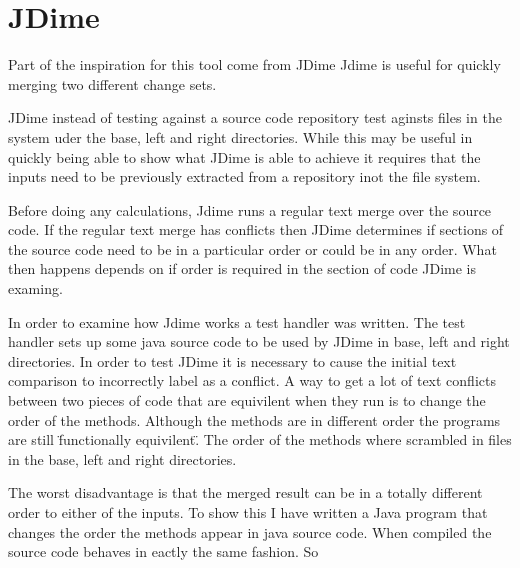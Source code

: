 
\chapter{JDime}
Part of the inspiration for this tool come from JDime
Jdime is useful for quickly merging two different change sets. 

JDime instead of testing against a source code repository test aginsts files in the system uder the base, left and right directories.
While this may be useful in quickly being able to show what JDime is able to achieve it requires that the inputs need to be previously extracted from a repository inot the file system.

Before doing any calculations, Jdime runs a regular text merge over the source code.  
If the regular text merge has conflicts then JDime determines if sections of the source code need to be in a particular order or could be in any order.
What then happens depends on if order is required in the section of code JDime is examing.


In order to examine how Jdime works a test handler was written.
The test handler sets up some java source code to be used by JDime in base, left and right directories.
In order to test JDime it is necessary to cause the initial text comparison to incorrectly label as a conflict.
A way to get a lot of text conflicts between two pieces of code that are equivilent when they run is to change the order of the methods.
Although the methods are in different order the programs are still \"functionally equivilent\".
The order of the methods where scrambled in files in the base, left and right directories.



The worst disadvantage is that the merged result can be in a totally different order to either of the inputs.
To show this I have written a Java program that changes the order the methods appear in java source code. 
When compiled the source code behaves in eactly the same fashion.
So 





 







